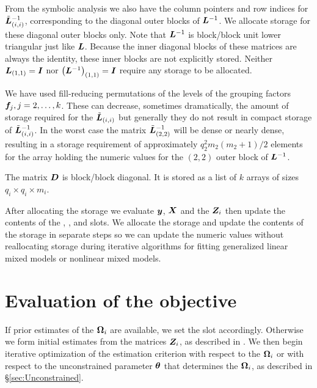 \documentclass[12pt]{article}
\begin{document}
From the symbolic analysis we also have the column pointers and row
indices for $\tilde{\bm{L}}^{-1}_{(i,i)}$, corresponding to the diagonal outer
blocks of $\bm{L}^{-1}$.  We allocate storage for these diagonal outer
blocks only.  Note that $\bm{L}^{-1}$ is block/block unit lower
triangular just like $\bm{L}$.  Because the inner diagonal blocks of
these matrices are always the identity, these inner blocks are not
explicitly stored.  Neither $\bm{L}_{(1,1)}=\bm{I}$ nor
$\left(\bm{L}^{-1}\right)_{(1,1)}=\bm{I}$ require any storage to be
allocated.

We have used fill-reducing permutations of the levels of the grouping
factors $\bm{f}_j,j=2,\dots,k$.  These can decrease, sometimes
dramatically, the amount of storage required for the $\tilde{\bm{L}}_{(i,i)}$ but
generally they do not result in compact storage of
$\tilde{\bm{L}}_{(i,i)}^{-1}$.  In the worst case the matrix $\tilde{\bm{L}}_{(2,2)}^{-1}$
will be dense or nearly dense, resulting in a storage requirement of
approximately $q_2^2 m_2(m_2+1)/2$ elements for the array holding the
numeric values for the $(2,2)$ outer block of $\bm{L}^{-1}$.

The matrix $\bm{D}$ is block/block diagonal. It is stored as a list of
$k$ arrays of sizes $q_i\times q_i\times m_i$.

After allocating the storage we evaluate $\bm{y}$, $\bm{X}$ and the $\bm{Z}_i$
then update the contents of the , , and 
slots.  We allocate the storage and update the contents of the storage
in separate steps so we can update the numeric values without
reallocating storage during iterative algorithms for fitting
generalized linear mixed models or nonlinear mixed models.

\section{Evaluation of the objective}
\label{sec:Cholesky}

If prior estimates of the $\bm{\Omega}_i$ are available, we set the
 slot accordingly.  Otherwise we form initial estimates
from the matrices $\bm{Z}_i$, as described in
\citet[ch.~3]{pinh:bate:2000}.  We then begin iterative optimization
of the estimation criterion with respect to the $\bm{\Omega}_i$ or with
respect to the unconstrained parameter $\bm{\theta}$ that determines the
$\bm{\Omega}_i$, as described in \S\ref{sec:Unconstrained}.
\end{document}
